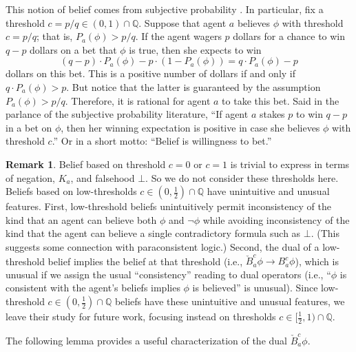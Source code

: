 \documentclass[12pt]{article}
\theoremstyle{definition}
\newtheorem{remark}[theorem]{Remark}
\newcommand{\Rat}{\mathbb{Q}}  %
\begin{document}
This notion of belief comes from subjective probability
\cite{Jeffrey2004:sptrt}.  In particular, fix a threshold
$c=p/q\in(0,1)\cap\Rat$.  Suppose that agent $a$ believes $\phi$ with
threshold $c=p/q$; that is, $P_a(\phi)>p/q$.  If the agent wagers $p$
dollars for a chance to win $q-p$ dollars on a bet that $\phi$ is
true, then she expects to win
\[
(q-p)\cdot P_a(\phi) - p\cdot(1-P_a(\phi)) = q\cdot P_a(\phi) - p
\]
dollars on this bet.  This is a positive number of dollars if and only
if $q\cdot P_a(\phi)>p$.  But notice that the latter is guaranteed by
the assumption $P_a(\phi)>p/q$.  Therefore, it is rational for agent
$a$ to take this bet.  Said in the parlance of the subjective
probability literature, ``If agent $a$ stakes $p$ to win $q-p$ in a
bet on $\phi$, then her winning expectation is positive in case she
believes $\phi$ with threshold $c$.''  Or in a short motto: ``Belief
is willingness to bet.''

\begin{remark}
  Belief based on threshold $c=0$ or $c=1$ is trivial to express in
  terms of negation, $K_a$, and falsehood $\bot$.  So we do not
  consider these thresholds here.  Beliefs based on low-thresholds
  $c\in(0,\frac 12)\cap\Rat$ have unintuitive and unusual features.
  First, low-threshold beliefs unintuitively permit inconsistency of
  the kind that an agent can believe both $\phi$ and $\lnot\phi$ while
  avoiding inconsistency of the kind that the agent can believe a
  single contradictory formula such as $\bot$. (This suggests some
  connection with paraconsistent logic.)  Second, the dual of a
  low-threshold belief implies the belief at that threshold (i.e.,
  $\check B_a^c\phi\to B_a^c\phi$), which is unusual if we assign the
  usual ``consistency'' reading to dual operators (i.e., ``$\phi$ is
  consistent with the agent's beliefs implies $\phi$ is believed'' is
  unusual).  Since low-threshold $c\in(0,\frac12)\cap\Rat$ beliefs
  have these unintuitive and unusual features, we leave their study
  for future work, focusing instead on thresholds $c\in[\frac
  12,1)\cap\Rat$.
\end{remark}

The following lemma provides a useful characterization of the dual
$\check B^c_a\phi$.
\end{document}
